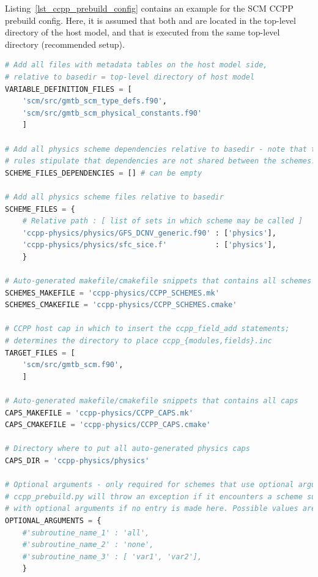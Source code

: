 Listing~\ref{lst_ccpp_prebuild_config} contains an example for the SCM CCPP prebuild config. Here, it is assumed that both  and  are located in the top-level directory of the host model, and that  is executed from the same top-level directory (recommended setup).
\begin{lstlisting}[language=python,
                 basicstyle=\scriptsize\ttfamily,
                 label=lst_ccpp_prebuild_config,
                 float=p,
                 caption=CCPP prebuild config for SCM (shortened)]
# Add all files with metadata tables on the host model side,
# relative to basedir = top-level directory of host model
VARIABLE_DEFINITION_FILES = [
    'scm/src/gmtb_scm_type_defs.f90',
    'scm/src/gmtb_scm_physical_constants.f90'
    ]

# Add all physics scheme dependencies relative to basedir - note that the CCPP
# rules stipulate that dependencies are not shared between the schemes!
SCHEME_FILES_DEPENDENCIES = [] # can be empty

# Add all physics scheme files relative to basedir
SCHEME_FILES = {
    # Relative path : [ list of sets in which scheme may be called ]
    'ccpp-physics/physics/GFS_DCNV_generic.f90' : ['physics'],
    'ccpp-physics/physics/sfc_sice.f'           : ['physics'],
    }

# Auto-generated makefile/cmakefile snippets that contains all schemes
SCHEMES_MAKEFILE = 'ccpp-physics/CCPP_SCHEMES.mk'
SCHEMES_CMAKEFILE = 'ccpp-physics/CCPP_SCHEMES.cmake'

# CCPP host cap in which to insert the ccpp_field_add statements;
# determines the directory to place ccpp_{modules,fields}.inc
TARGET_FILES = [
    'scm/src/gmtb_scm.f90',
    ]

# Auto-generated makefile/cmakefile snippets that contains all caps
CAPS_MAKEFILE = 'ccpp-physics/CCPP_CAPS.mk'
CAPS_CMAKEFILE = 'ccpp-physics/CCPP_CAPS.cmake'

# Directory where to put all auto-generated physics caps
CAPS_DIR = 'ccpp-physics/physics'

# Optional arguments - only required for schemes that use optional arguments.
# ccpp_prebuild.py will throw an exception if it encounters a scheme subroutine
# with optional arguments if no entry is made here. Possible values are:
OPTIONAL_ARGUMENTS = {
    #'subroutine_name_1' : 'all',
    #'subroutine_name_2' : 'none',
    #'subroutine_name_3' : [ 'var1', 'var2'],
    }


\end{lstlisting}
